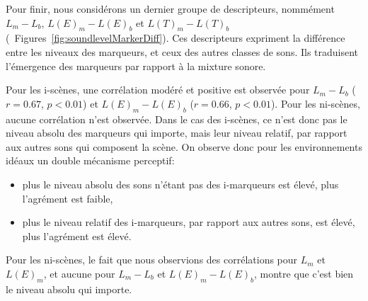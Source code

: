 Pour finir, nous considérons un dernier groupe de descripteurs, nommément $L_m-L_b$, $L(E)_m-L(E)_b$ et $L(T)_m-L(T)_b$ (\cf~Figures~\ref{fig:soundlevelMarkerDiff}). Ces descripteurs expriment la différence entre les niveaux des marqueurs, et ceux des autres classes de sons. Ils traduisent l'émergence des marqueurs par rapport à la mixture sonore.

Pour les i-scènes, une corrélation modéré et positive est observée pour $L_m-L_b$ ($r=0.67$, $p<0.01$) et $L(E)_m-L(E)_b$ ($r=0.66$, $p<0.01$). Pour les ni-scènes, aucune corrélation n'est observée. Dans le cas des i-scènes, ce n'est donc pas le niveau absolu des marqueurs qui importe, mais leur niveau relatif, par rapport aux autres sons qui composent la scène. On observe donc pour les environnements idéaux un double mécanisme perceptif: 

\begin{itemize}
\item plus le niveau absolu des sons n'étant pas des i-marqueurs est élevé, plus l'agrément est faible,
\item plus le niveau relatif des i-marqueurs, par rapport aux autres sons, est élevé, plus l'agrément est élevé.
\end{itemize}

Pour les ni-scènes, le fait que nous observions des corrélations pour $L_m$ et $L(E)_m$, et aucune pour $L_m-L_b$ et $L(E)_m-L(E)_b$, montre que c'est bien le niveau absolu qui importe.

